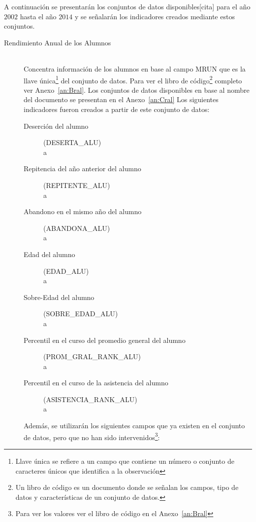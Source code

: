    A continuación se presentarán los conjuntos de datos disponibles[cita] para el año $2002$ hasta el año $2014$ y se señalarán los indicadores creados mediante estos conjuntos.
    \begin{description}
        \item[Rendimiento Anual de los Alumnos] \hfill \\
        Concentra información de los alumnos en base al campo MRUN que es la llave única\footnote{Llave única se refiere a un campo que contiene un número o conjunto de caracteres únicos que identifica a la observación} del conjunto de datos. Para ver el libro de código\footnote{Un libro de código es un documento donde se señalan los campos, tipo de datos y características de un conjunto de datos.} completo ver Anexo~\ref{an:Bral}. Los conjuntos de datos disponibles en base al nombre del documento se presentan en el Anexo~\ref{an:Cral}
        Los siguientes indicadores fueron creados a partir de este conjunto de datos:
            \begin{description}
              \item[Deserción del alumno] (DESERTA\_ALU) \hfill \\
              a
              \item[Repitencia del año anterior del alumno] (REPITENTE\_ALU) \hfill \\
              a
              \item[Abandono en el mismo año del alumno] (ABANDONA\_ALU) \hfill \\
              a
              \item[Edad del alumno] (EDAD\_ALU)\hfill \\
              a
              \item[Sobre-Edad del alumno] (SOBRE\_EDAD\_ALU) \hfill \\
              a
              \item[Percentil en el curso del promedio general del alumno] (PROM\_GRAL\_RANK\_ALU) \hfill \\
              a
              \item[Percentil en el curso de la asistencia del alumno] (ASISTENCIA\_RANK\_ALU) \hfill \\
              a
            \end{description}
        Además, se utilizarán los siguientes campos que ya existen en el conjunto de datos, pero que no han sido intervenidos\footnote{Para ver los valores ver el libro de código en el Anexo~\ref{an:Bral}}:

\end{description}
